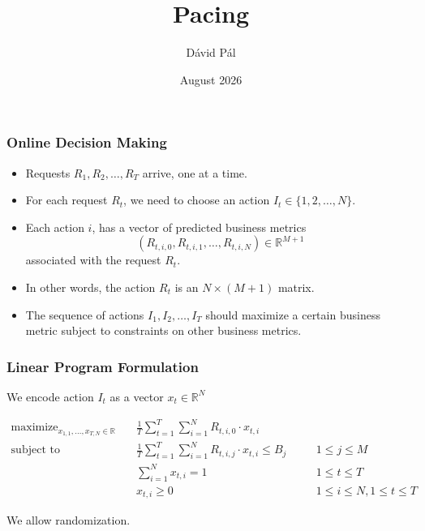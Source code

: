 \documentclass[usenames,dvipsnames]{beamer}
\title{Pacing}
\date{August 2026}
\author{D\'avid P\'al}
\institute{Uber, Sunnyvale}
\DeclareMathOperator*{\maximize}{maximize}
\DeclareMathOperator*{\subjectto}{subject\ to}
\newcommand{\R}{\mathbb{R}}
\begin{document}
\begin{frame}
\maketitle
\end{frame}

\begin{frame}
\frametitle{Online Decision Making}

\begin{itemize}
\item Requests $R_1, R_2, \dots, R_T$ arrive, one at a time.
\item For each request $R_t$, we need to choose an action $I_t \in \{1,2,\dots,N\}$.
\item Each action $i$, has a vector of predicted business metrics
$$
(R_{t,i,0}, R_{t,i,1}, \dots, R_{t,i,N}) \in \R^{M+1}
$$
associated with the request $R_t$.
\item In other words, the action $R_t$ is an $N \times (M+1)$ matrix.
\item The sequence of actions $I_1, I_2, \dots, I_T$ should maximize a
certain business metric subject to constraints on other business metrics.
\end{itemize}
\end{frame}

\begin{frame}
\frametitle{Linear Program Formulation}

We encode action $I_t$ as a vector $x_t \in \R^N$

\begin{align*}
\maximize_{x_{1,1}, \dots, x_{T,N} \in \R} \quad & \frac{1}{T} \sum_{t=1}^T \sum_{i=1}^N R_{t,i,0} \cdot x_{t,i} \\
\subjectto \quad & \frac{1}{T} \sum_{t=1}^T \sum_{i=1}^N R_{t,i,j} \cdot x_{t,i} \le B_j && \quad 1 \le j \le M \\
& \sum_{i=1}^N x_{t,i} = 1 && \quad 1 \le t \le T \\
& x_{t,i} \ge 0 && \quad 1 \le i \le N, 1 \le t \le T
\end{align*}

We allow randomization.
\end{frame}
\end{document}
